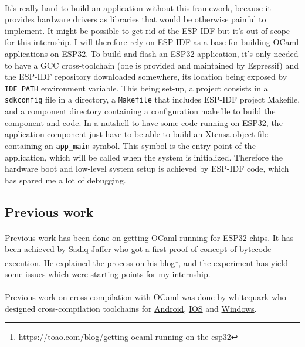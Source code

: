 \documentclass[a4paper]{article}
\begin{document}
\paragraph{} 
It's really hard to build an application without this framework, because it provides hardware drivers as libraries that would be otherwise painful to implement. It might be possible to get rid of the ESP-IDF but it's out of scope for this internship.
I will therefore rely on ESP-IDF as a base for building OCaml applications on ESP32. To build and flash an ESP32 application, it's only needed to have a GCC cross-toolchain (one is provided and maintained by Espressif) and the ESP-IDF repository downloaded somewhere, its location being exposed by \texttt{IDF\_PATH} environment variable. This being set-up, a project consists in a \texttt{sdkconfig} file in a directory, a \texttt{Makefile} that includes ESP-IDF project Makefile, and a component directory containing a configuration makefile to build the component and code.
In a nutshell to have some code running on ESP32, the application component just have to be able to build an Xtensa object file containing an \texttt{app\_main} symbol. This symbol is the entry point of the application, which will be called when the system is initialized. Therefore the hardware boot and low-level system setup is achieved by ESP-IDF code, which has spared me a lot of debugging.
\subsection{Previous work}
\paragraph{}
Previous work has been done on getting OCaml running for ESP32 chips. It has been achieved by Sadiq Jaffer who got a first proof-of-concept of bytecode execution. He explained the process on his blog\footnote{\url{https://toao.com/blog/getting-ocaml-running-on-the-esp32}}, and the experiment has yield some issues which were starting points for my internship.
\paragraph{}
Previous work on cross-compilation with OCaml was done by \href{https://whitequark.org}{whitequark} who designed cross-compilation toolchains for \href{https://github.com/ocaml-cross/opam-cross-android}{Android}, \href{https://github.com/ocaml-cross/opam-cross-ios}{IOS} and \href{https://github.com/ocaml-cross/opam-cross-windows}{Windows}.
\end{document}
